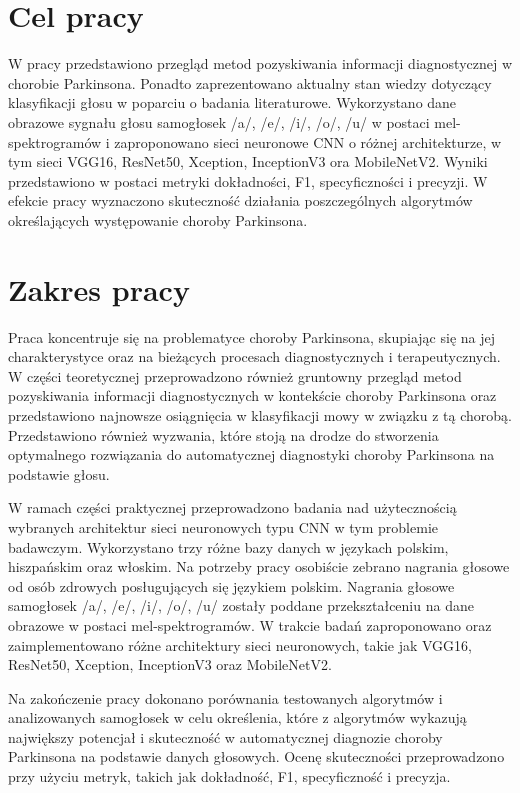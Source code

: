 
\section{Cel pracy}
\label{sec:celPracy}

W pracy przedstawiono przegląd metod pozyskiwania informacji diagnostycznej w chorobie Parkinsona.
Ponadto zaprezentowano aktualny stan wiedzy dotyczący klasyfikacji głosu w poparciu o badania literaturowe.
Wykorzystano dane obrazowe sygnału głosu samogłosek /a/, /e/, /i/, /o/, /u/ w postaci mel-spektrogramów i zaproponowano sieci neuronowe CNN o różnej architekturze, w tym sieci VGG16, ResNet50, Xception, InceptionV3 ora MobileNetV2.
Wyniki przedstawiono w postaci metryki dokładności, F1, specyficzności i precyzji.
W efekcie pracy wyznaczono skuteczność działania poszczególnych algorytmów określających występowanie choroby Parkinsona.


\section{Zakres pracy}
\label{sec:zakresPracy}


Praca koncentruje się na problematyce choroby Parkinsona, skupiając się na jej charakterystyce oraz na bieżących procesach diagnostycznych i terapeutycznych.
W części teoretycznej przeprowadzono również gruntowny przegląd metod pozyskiwania informacji diagnostycznych w kontekście choroby Parkinsona oraz przedstawiono najnowsze osiągnięcia w klasyfikacji mowy w związku z tą chorobą.
Przedstawiono również wyzwania, które stoją na drodze do stworzenia optymalnego rozwiązania do automatycznej diagnostyki choroby Parkinsona na podstawie głosu.

W ramach części praktycznej przeprowadzono badania nad użytecznością wybranych architektur sieci neuronowych typu CNN w tym problemie badawczym.
Wykorzystano trzy różne bazy danych w językach polskim, hiszpańskim oraz włoskim.
Na potrzeby pracy osobiście zebrano nagrania głosowe od osób zdrowych posługujących się językiem polskim.
Nagrania głosowe samogłosek  /a/, /e/, /i/, /o/, /u/ zostały poddane przekształceniu na dane obrazowe w postaci mel-spektrogramów.
W trakcie badań zaproponowano oraz zaimplementowano różne architektury sieci neuronowych, takie jak VGG16, ResNet50, Xception, InceptionV3 oraz MobileNetV2.

Na zakończenie pracy dokonano porównania testowanych algorytmów i analizowanych samogłosek w celu określenia, które z algorytmów wykazują największy potencjał i skuteczność w automatycznej diagnozie choroby Parkinsona na podstawie danych głosowych.
Ocenę skuteczności przeprowadzono  przy użyciu metryk, takich jak dokładność, F1, specyficzność i precyzja.
